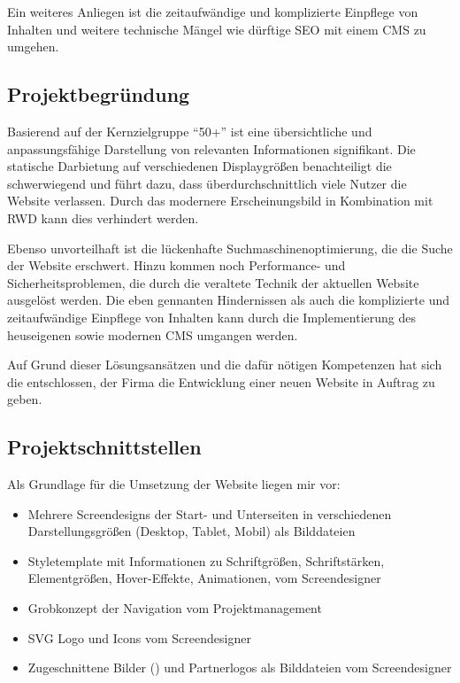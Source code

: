 Ein weiteres Anliegen ist die zeitaufwändige und komplizierte Einpflege von
Inhalten und weitere technische Mängel wie \zB dürftige \ac{SEO} mit einem
\ac{CMS} zu umgehen.


\subsection{Projektbegründung} 
\label{sec:Projektbegruendung}
Basierend auf der Kernzielgruppe "`50+"' ist eine übersichtliche und
anpassungsfähige Darstellung von relevanten Informationen signifikant. 
Die statische Darbietung auf verschiedenen Displaygrößen benachteiligt die
 schwerwiegend und führt dazu, dass
überdurchschnittlich viele Nutzer die Website verlassen. Durch das modernere
Erscheinungsbild in Kombination mit \ac{RWD} kann dies verhindert werden.
 
Ebenso unvorteilhaft ist die lückenhafte Suchmaschinenoptimierung, die die Suche
der Website erschwert. Hinzu kommen noch Performance- und
Sicherheitsproblemen, die durch die veraltete Technik der aktuellen Website
ausgelöst werden. Die eben gennanten Hindernissen als auch die komplizierte und
zeitaufwändige Einpflege von Inhalten kann durch die Implementierung des heuseigenen
sowie modernen \ac{CMS} \ct umgangen werden.

Auf Grund dieser Lösungsansätzen und die dafür nötigen Kompetenzen hat sich die
\kunde entschlossen, der Firma \mh die Entwicklung einer neuen Website in
Auftrag zu geben.

\subsection{Projektschnittstellen} 
\label{sec:Projektschnittstellen}



Als Grundlage für die Umsetzung der Website liegen mir vor:
\begin{itemize}
	\item Mehrere Screendesigns der Start- und Unterseiten in verschiedenen
Darstellungsgrößen (Desktop, Tablet, Mobil) als Bilddateien
	\item Styletemplate mit Informationen zu Schriftgrößen, Schriftstärken,
Elementgrößen, Hover-Effekte, Animationen, \usw vom Screendesigner
	\item Grobkonzept der Navigation vom Projektmanagement
	\item SVG Logo und Icons vom Screendesigner
	\item Zugeschnittene Bilder () und Partnerlogos als
	Bilddateien vom Screendesigner
\end{itemize}

